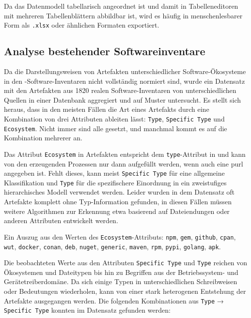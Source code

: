 Da das Datenmodell tabellarisch angeordnet ist und damit in Tabelleneditoren mit mehreren Tabellenblättern abbildbar ist, wird es häufig in menschenlesbarer Form als \texttt{.xlsx} oder ähnlichen Formaten exportiert.

\subsection{Analyse bestehender Softwareinventare}\label{subsec:analysis-ae-software-inventories}

Da die Darstellungsweisen von Artefakten unterschiedlicher Software-Ökosysteme in den \metaeffekt-Software-Inventaren nicht vollständig normiert sind, wurde ein Datensatz mit den Artefakten aus 1820 realen Software-Inventaren von unterschiedlichen Quellen in einer Datenbank aggregiert und auf Muster untersucht.
Es stellt sich heraus, dass in den meisten Fällen die Art eines Artefakts durch eine Kombination von drei Attributen ableiten lässt: \texttt{Type}, \texttt{Specific Type} und \texttt{Ecosystem}.
Nicht immer sind alle gesetzt, und manchmal kommt es auf die Kombination mehrerer an.

Das Attribut \texttt{Ecosystem} in Artefakten entspricht dem \texttt{type}-Attribut in  und kann von den erzeugenden Prozessen nur dann aufgefüllt werden, wenn auch eine \acrshort{purl} angegeben ist.
Fehlt dieses, kann meist \texttt{Specific Type} für eine allgemeine Klassifikation und \texttt{Type} für die spezifischere Einordnung in ein zweistufiges hierarchisches Modell verwendet werden.
Leider wurden in dem Datensatz oft Artefakte komplett ohne Typ-Information gefunden, in diesen Fällen müssen weitere Algorithmen zur Erkennung etwa basierend auf Dateiendungen oder anderen Attributen entwickelt werden.

Ein Auszug aus den Werten des \texttt{Ecosystem}-Attributs:
\texttt{npm}, \texttt{gem}, \texttt{github}, \texttt{cpan}, \texttt{wut}, \texttt{docker}, \texttt{conan}, \texttt{deb}, \texttt{nuget}, \texttt{generic}, \texttt{maven}, \texttt{rpm}, \texttt{pypi}, \texttt{golang}, \texttt{apk}.

Die beobachteten Werte aus den Attributen \texttt{Specific Type} und \texttt{Type} reichen von Ökosystemen und Dateitypen bis hin zu Begriffen aus der Betriebssystem- und Gerätetreiberdomäne.
Da sich einige Typen in unterschiedlichen Schreibweisen oder Bedeutungen wiederholen, kann von einer stark heterogenen Entstehung der Artefakte ausgegangen werden.
Die folgenden Kombinationen aus \texttt{Type} → \texttt{Specific Type} konnten im Datensatz gefunden werden:

